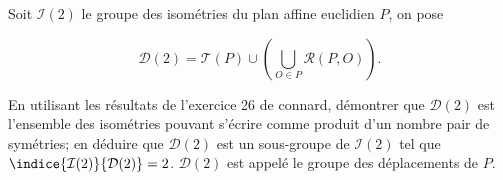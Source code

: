 Soit $\mathcal I (2)$ le groupe des isométries du plan affine euclidien $P$, on pose 

\[\mathcal{D}(2) = \mathcal{T}(P) \cup \left( \bigcup_{O \in P} \mathcal{R} (P,O) \right).\]

En utilisant les résultats de l'exercice 26 de connard, démontrer que $\mathcal D (2)$ est l'ensemble des isométries pouvant s'écrire comme produit d'un nombre pair de symétries; en déduire que $\mathcal D (2)$ est un sous-groupe de $\mathcal I (2)$ tel que $\indice {\mathcal I (2)} {\mathcal D (2)} = 2$. $\mathcal D (2)$ est appelé le groupe des déplacements de $P$.